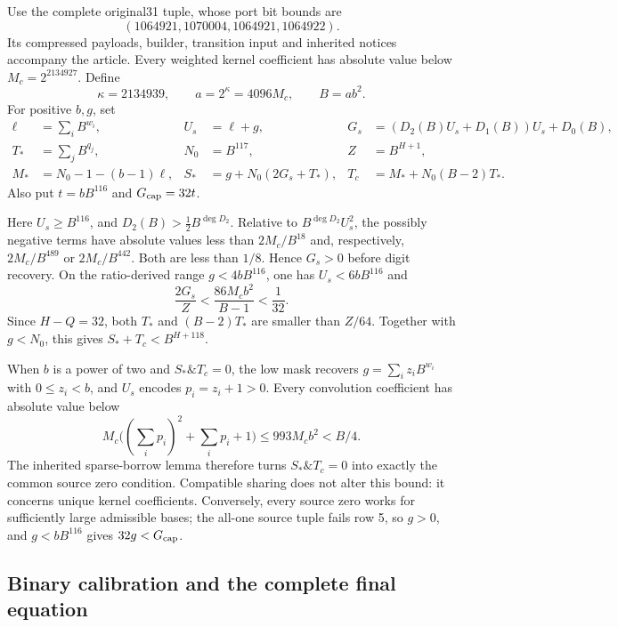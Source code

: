 Use the complete original31 tuple, whose port bit bounds are
\[
 (1064921,1070004,1064921,1064922).
\]
Its compressed payloads, builder,
transition input and inherited notices accompany the article. Every
weighted kernel coefficient has absolute value below
$M_c=2^{2134927}$. Define
\[
 \kappa=2134939,\qquad a=2^\kappa=4096M_c,\qquad B=ab^2.
\]
For positive $b,g$, set
\begin{align*}
 \ell&=\sum_i B^{w_i}, & U_s&=\ell+g,
 &G_s&=(D_2(B)U_s+D_1(B))U_s+D_0(B),\\
 T_*&=\sum_jB^{q_j}, & N_0&=B^{117},
 &Z&=B^{H+1},\\
 M_*&=N_0-1-(b-1)\ell,
 &S_*&=g+N_0(2G_s+T_*),
 &T_c&=M_*+N_0(B-2)T_*.
\end{align*}
Also put $t=bB^{116}$ and $G_{\rm cap}=32t$.

Here $U_s\ge B^{116}$, and
$D_2(B)>\tfrac12B^{\deg D_2}$. Relative to
$B^{\deg D_2}U_s^2$, the possibly negative terms have absolute values
less than $2M_c/B^{18}$ and, respectively, $2M_c/B^{489}$ or
$2M_c/B^{442}$. Both are less than $1/8$. Hence $G_s>0$ before digit
recovery. On the ratio-derived range $g<4bB^{116}$, one has $U_s<6bB^{116}$
and
\[
 \frac{2G_s}{Z}<\frac{86M_cb^2}{B-1}<\frac1{32}.
\]
Since $H-Q=32$, both $T_*$ and $(B-2)T_*$ are smaller than $Z/64$.
Together with $g<N_0$, this gives $S_*+T_c<B^{H+118}$.

When $b$ is a power of two and $S_*\mathbin{\&}T_c=0$, the low mask recovers
$g=\sum_i z_iB^{w_i}$ with $0\le z_i<b$, and $U_s$ encodes
$p_i=z_i+1>0$. Every convolution coefficient has absolute value below
\[
 M_c\bigl((\textstyle\sum_i p_i)^2+\sum_i p_i+1\bigr)
 \le 993M_cb^2<B/4.
\]
The inherited sparse-borrow lemma therefore turns $S_*\mathbin{\&}T_c=0$
into exactly the common source zero condition. Compatible sharing does not
alter this bound: it concerns unique kernel coefficients. Conversely, every
source zero works for sufficiently large admissible bases; the all-one
source tuple fails row 5, so $g>0$, and $g<bB^{116}$ gives $32g<G_{\rm cap}$.

\subsection{Binary calibration and the complete final equation}

